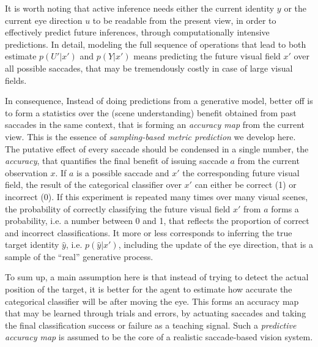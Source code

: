 It is worth noting that active inference needs either the current identity $y$ or the current eye direction $u$ to be readable from the present view, in order to effectively predict future inferences, through computationally intensive predictions. In detail, modeling the full sequence of operations that lead to both estimate $p(U'|x')$ and $p(Y|x')$ means predicting the future visual field $x'$ over all possible saccades, that may be tremendously costly in case of large visual fields. 

In consequence, Instead of doing predictions from a generative model, better off is to form a statistics over the (scene understanding) benefit obtained from past saccades in the same context, that is forming an \emph{accuracy map} from the current view. This is the essence of \emph{sampling-based metric prediction} we develop here. The putative effect of every saccade should be condensed in a single number, the \emph{accuracy}, that quantifies the final benefit of issuing saccade $a$ %
from the current observation $x$. If $a$ is a possible saccade and $x'$ the corresponding future visual field, the result of the categorical classifier over $x'$ can either be correct (1) or incorrect (0).
If this experiment is repeated many times over many visual scenes, the probability of correctly classifying the future visual field $x'$ from $a$ forms a probability, i.e. a number between 0 and 1, that reflects the proportion of correct and incorrect classifications.
It more or less corresponds to inferring the true target identity $\hat{y}$, i.e. $p(\hat{y}|x')$, including the update of the eye direction, that is a sample of the ``real'' generative process.

To sum up, a main assumption here is that instead of trying to detect the actual position of the target, it is better for the agent to estimate how accurate the categorical classifier will be after moving the eye. This forms an accuracy map that may be learned through trials and errors, by actuating saccades %
and taking the final classification success or failure as a teaching signal.
Such a \emph{predictive accuracy map} is assumed to be the core of a realistic saccade-based vision system.

